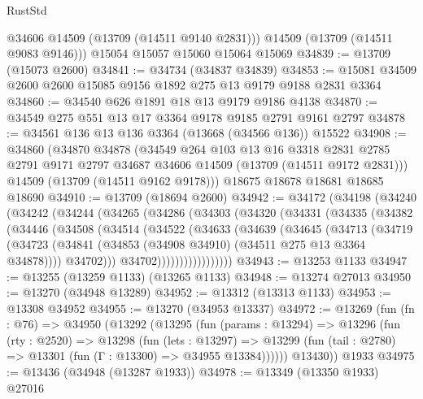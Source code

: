 \begin{lexlean}{RustStd}
\begin{coremodule}
        @34606
        @14509
        (@13709 (@14511 @9140 @2831)))
      @14509
      (@13709 (@14511 @9083 @9146)))
    @15054
    @15057
    @15060
    @15064
    @15069
@34839 := @13709 (@15073 @2600)
@34841 := @34734 (@34837 @34839)
@34853 := @15081 @34509 @2600 @2600 @15085 @9156 @1892 @275 @13 @9179 @9188 @2831 @3364
@34860 := @34540 @626 @1891 @18 @13 @9179 @9186 @4138
@34870 := @34549 @275 @551 @13 @17 @3364 @9178 @9185 @2791 @9161 @2797
@34878 := @34561 @136 @13 @136 @3364 (@13668 (@34566 @136)) @15522
@34908 := @34860
    (@34870
      @34878
      (@34549
        @264
        @103
        @13
        @16
        @3318
        @2831
        @2785
        @2791
        @9171
        @2797
        @34687
        @34606
        @14509
        (@13709 (@14511 @9172 @2831)))
      @14509
      (@13709 (@14511 @9162 @9178)))
    @18675
    @18678
    @18681
    @18685
    @18690
@34910 := @13709 (@18694 @2600)
@34942 := @34172
    (@34198
      (@34240
        (@34242
          (@34244
            (@34265
              (@34286
                (@34303
                  (@34320
                    (@34331
                      (@34335
                        (@34382
                          (@34446
                            (@34508
                              (@34514
                                (@34522
                                  (@34633
                                    (@34639
                                      (@34645
                                        (@34713
                                          (@34719
                                            (@34723
                                              (@34841
                                                (@34853
                                                  (@34908 @34910)
                                                  (@34511 @275 @13 @3364 @34878))))
                                            @34702)))
                                      @34702)))))))))))))))))
@34943 := @13253 @1133
@34947 := @13255 (@13259 @1133) (@13265 @1133)
@34948 := @13274 @27013
@34950 := @13270 (@34948 @13289)
@34952 := @13312 (@13313 @1133)
@34953 := @13308 @34952
@34955 := @13270 (@34953 @13337)
@34972 := @13269
    (fun (fn : @76) =>
    @34950
      (@13292
        (@13295
          (fun (params : @13294) =>
          @13296
            (fun (rty : @2520) =>
            @13298
              (fun (lets : @13297) =>
              @13299 (fun (tail : @2780) => @13301 (fun (Γ : @13300) => @34955 @13384))))))
        @13430))
    @1933
@34975 := @13436 (@34948 (@13287 @1933))
@34978 := @13349 (@13350 @1933) @27016

\end{coremodule}
\end{lexlean}
